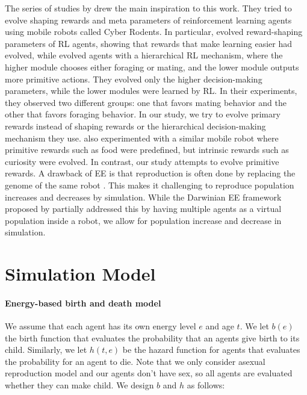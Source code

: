 The series of studies by \citet{elfwingBiologicallyInspiredEmbodied2005,elfwingDarwinianEmbodiedEvolution2011a,elfwingEmergencePolymorphicMating2014} drew the main inspiration to this work.
They tried to evolve shaping rewards and meta parameters of reinforcement learning agents using mobile robots called Cyber Rodents. In particular, \citet{elfwingDarwinianEmbodiedEvolution2011a} evolved reward-shaping parameters of RL agents, showing that rewards that make learning easier had evolved, while \citet{elfwingEmergencePolymorphicMating2014} evolved agents with a hierarchical RL mechanism, where the higher module chooses either foraging or mating, and the lower module outputs more primitive actions. They evolved only the higher decision-making parameters, while the lower modules were learned by RL. In their experiments, they observed two different groups: one that favors mating behavior and the other that favors foraging behavior. In our study, we try to evolve primary rewards instead of shaping rewards or the hierarchical decision-making mechanism they use. \citet{uchibeFindingIntrinsicRewards2008} also experimented with a similar mobile robot where primitive rewards such as food were predefined, but intrinsic rewards such as curiosity were evolved. In contrast, our study attempts to evolve primitive rewards. A drawback of EE is that reproduction is often done by replacing the genome of the same robot \citep{bredecheEmbodiedEvolutionCollective2018}. This makes it challenging to reproduce population increases and decreases by simulation. While the Darwinian EE framework proposed by \citet{elfwingDarwinianEmbodiedEvolution2011a} partially addressed this by having multiple agents as a virtual population inside a robot, we allow for population increase and decrease in simulation.

\section{Simulation Model}\label{sec:3}

\paragraph{Energy-based birth and death model}
We assume that each agent has its own energy level $e$ and age $t$. We let $b(e)$ the birth function that evaluates the probability that an agents give birth to its child. Similarly, we let $h(t, e)$ be the hazard function for agents that evaluates the probability for an agent to die. Note that we only consider asexual reproduction model and our agents don't have sex, so all agents are evaluated whether they can make child. We design $b$ and $h$ as follows:

